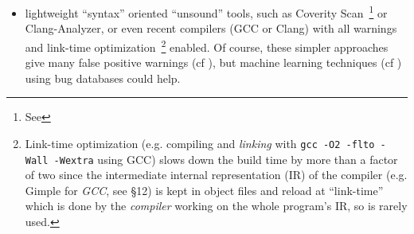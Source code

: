 \begin{itemize}
    lines of C code (following some \emph{particular} coding style or
    using some definable \emph{subset} of the C language\footnote{For
      instance, both \emph{Frama-C} and \emph{Astrée} have issues in
      dealing with standard dynamic C memory allocation above
      \texttt{malloc}; since they target above all the safety critical
      real-time embedded software market where such allocations are
      \emph{forbidden}.}). Some formal analysis approaches include a
    definition of a strict subset of \emph{C}, thru perhaps some
    automatically generated code (cf. \cite{Bhargavan:DFHPRR17}) from
    some DSL.  In practice, the formal sound static analyzers are able
    to prove \emph{automatically} some \emph{simple} properties of
    small, highly critical, software components (e.g. avoiding the
    need of \emph{unit testing} at the expense of very \emph{costly
      software development efforts}).

  \item lightweight ``syntax'' oriented ``unsound'' tools, such as
    Coverity Scan~\footnote{See } or
    Clang-Analyzer, or even recent compilers (GCC or Clang) with all
    warnings and link-time optimization~\footnote{Link-time
      optimization (e.g. compiling and \emph{linking} with \texttt{gcc
        -O2 -flto -Wall -Wextra} using GCC) slows down the build time by more than a
      factor of two since the intermediate internal representation (IR) of the
      compiler (e.g. Gimple  for \emph{GCC}, see \cite{gcc-internals} \S12) is kept in object files and
      reload at ``link-time'' which is done by the \emph{compiler}
      working on the whole program's IR, so is rarely used.}  enabled. Of
    course, these simpler approaches give many false positive warnings
    (cf \cite{Nadeem:2012:HFP}), but machine learning techniques (cf
    \cite{Perl:2015:VFP, flach:2012:machine-learning}) using bug databases could help.
    
\end{itemize}

